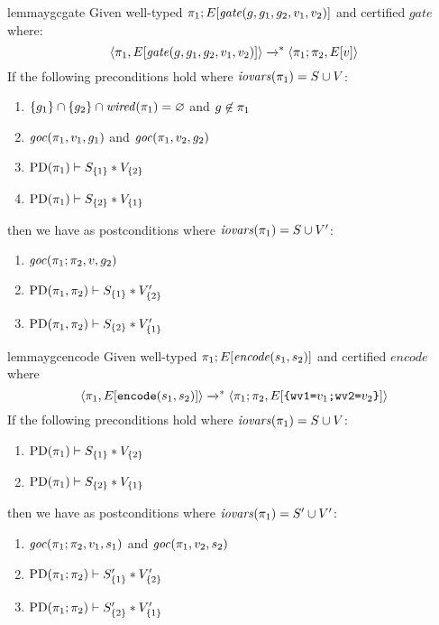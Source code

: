 \begin{restatable}{lemma}{ygcgate}
\label{lemma-ygc-preservation}
Given well-typed $\pi_1;E[\mathit{gate}(g,g_1,g_2,v_1,v_2)]$ and certified $\mathit{gate}$ where:
$$
\langle \pi_1,E[\mathit{gate}(g,g_1,g_2,v_1,v_2)] \rangle \xrightarrow{}^{*} \langle \pi_1;\pi_2,E[v] \rangle
$$
If the following preconditions hold where $\mathit{iovars}(\pi_1) = S \cup V$:
\begin{enumerate}
\item $\{ g_1 \} \cap \{ g_2 \} \cap \mathit{wired}(\pi_1) = \varnothing$ and $g \not\in \pi_1$
\item $\mathit{goc}(\pi_1,v_1,g_1)$ and $\mathit{goc}(\pi_1,v_2,g_2)$
\item $\mathrm{PD}(\pi_1) \vdash S_{\{1\}} * V_{\{2\}}$
\item $\mathrm{PD}(\pi_1) \vdash S_{\{2\}} * V_{\{1\}}$
\end{enumerate}
then we have as postconditions where $\mathit{iovars}(\pi_1) = S \cup V'$:
\begin{enumerate}
\item $\mathit{goc}(\pi_1;\pi_2,v,g_2)$
\item $\mathrm{PD}(\pi_1,\pi_2) \vdash S_{\{1\}} * V'_{\{2\}}$
\item $\mathrm{PD}(\pi_1,\pi_2) \vdash S_{\{2\}} * V'_{\{1\}}$
\end{enumerate}
\end{restatable}

\begin{restatable}{lemma}{ygcencode}
  \label{lemma-ygc-encode}
Given well-typed $\pi_1;E[\mathit{encode}(s_1,s_2)]$ and certified $\mathit{encode}$ where 
$$
\langle \pi_1,E[\texttt{encode}(s_1,s_2)] \rangle \xrightarrow{}^{*} \langle \pi_1;\pi_2,E[\texttt{\{wv1=}v_1\texttt{;wv2=}v_2\texttt{\}}] \rangle
$$
If the following preconditions hold where $\mathit{iovars}(\pi_1) = S \cup V$:
\begin{enumerate}
\item $\mathrm{PD}(\pi_1) \vdash S_{\{1\}} * V_{\{2\}}$
\item $\mathrm{PD}(\pi_1) \vdash S_{\{2\}} * V_{\{1\}}$
\end{enumerate}
then we have as postconditions where $\mathit{iovars}(\pi_1) = S' \cup V'$:
\begin{enumerate}
\item $\mathit{goc}(\pi_1;\pi_2,v_1,s_1)$ and $\mathit{goc}(\pi_1,v_2,s_2)$
\item $\mathrm{PD}(\pi_1;\pi_2) \vdash S'_{\{1\}} * V'_{\{2\}}$
\item $\mathrm{PD}(\pi_1;\pi_2) \vdash S'_{\{2\}} * V'_{\{1\}}$
\end{enumerate}
\end{restatable}

